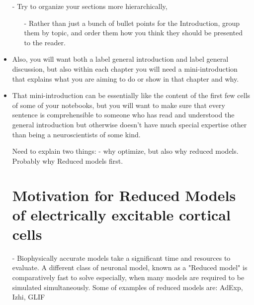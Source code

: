 \documentclass{article}
\begin{document}
\begin{itemize}
\item[-]  Try to organize your sections more hierarchically, \begin{itemize}

 \item[-] Rather than just a bunch of bullet points for the Introduction, group them by topic, and order them how you think they should be presented to the reader.  
\end{itemize}


\item Also, you will want both a label general introduction and label general discussion, but also within each chapter you will need a mini-introduction that explains what you are aiming to do or show in that chapter and why. 

\item That mini-introduction can be essentially like the content of the first few cells of some of your notebooks, but you will want to make sure that every sentence is comprehensible to someone who has read and understood the general introduction but otherwise doesn’t have much special expertise other than being a neuroscientists of some kind.


Need to explain two things:
- why optimize, but also why reduced models. Probably why Reduced models first.
\section{Motivation for Reduced Models of electrically excitable cortical cells}

\item[-] Biophysically accurate models take a significant time and resources to evaluate. A different class of neuronal model, known as a "Reduced model" is comparatively fast to solve especially, when many models are required to be simulated simultaneously. Some of examples of reduced models are: 
\subitem AdExp, Izhi, GLIF


\end{itemize}
\end{document}
